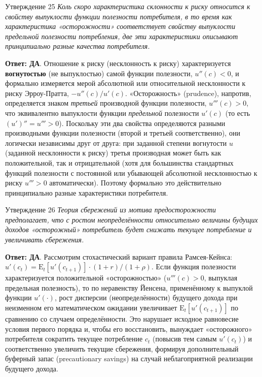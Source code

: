\documentclass[10pt,a4paper]{article}
\newcommand{\qda}{\textbf{\color{yesgreen}Ответ: ДА}}
\newenvironment{answer}[2]{%
  \begin{qbox}{Утверждение #1}
  \textit{#2}\par\smallskip
}{%
  \end{qbox}\vspace{2pt}
}
\begin{document}
\begin{answer}{25}{Коль скоро характеристика склонности к риску относится к свойству выпуклости функции полезности потребителя, в то время как характеристика «осторожности» соответствует свойству выпуклости предельной полезности потребления, две эти характеристики описывают принципиально разные качества потребителя.}
\qda. Отношение к риску (несклонность к риску) характеризуется \textbf{вогнутостью} (не выпуклостью) самой функции полезности, $u''(c)<0$, и формально измеряется мерой абсолютной или относительной несклонности к риску Эрроу-Пратта, $-u''(c)/u'(c)$. «Осторожность» (prudence), напротив, определяется знаком \emph{третьей} производной функции полезности, $u'''(c)>0$, что эквивалентно выпуклости функции \emph{предельной} полезности $u'(c)$ (то есть $(u')''=u'''>0$). Поскольку эти два свойства определяются разными производными функции полезности (второй и третьей соответственно), они логически независимы друг от друга: при заданной степени вогнутости $u$ (заданной несклонности к риску) третья производная может быть как положительной, так и отрицательной (хотя для большинства стандартных функций полезности с постоянной или убывающей абсолютной несклонностью к риску $u'''>0$ автоматически). Поэтому формально это действительно принципиально разные характеристики потребителя.
\end{answer}
 
\begin{answer}{26}{Теория сбережений из мотива предосторожности предполагает, что с ростом неопределённости относительно величины будущих доходов «осторожный» потребитель будет снижать текущее потребление и увеличивать сбережения.}
\qda. Рассмотрим стохастический вариант правила Рамсея-Кейнса: $u'(c_t)=\mathrm{E}_t[u'(c_{t+1})]\cdot(1+r)/(1+\rho)$. Если функция полезности характеризуется положительной «осторожностью» ($u'''(c)>0$, выпуклая предельная полезность), то по неравенству Йенсена, применённому к выпуклой функции $u'(\cdot)$, рост дисперсии (неопределённости) будущего дохода при неизменном его математическом ожидании увеличивает $\mathrm{E}_t[u'(c_{t+1})]$ по сравнению со случаем определённости. Это нарушает исходное равновесие условия первого порядка и, чтобы его восстановить, вынуждает «осторожного» потребителя сократить текущее потребление $c_t$ (повысив тем самым $u'(c_t)$) и соответственно увеличить текущие сбережения, формируя дополнительный буферный запас (precautionary savings) на случай неблагоприятной реализации будущего дохода.
\end{answer}
 
\end{document}
